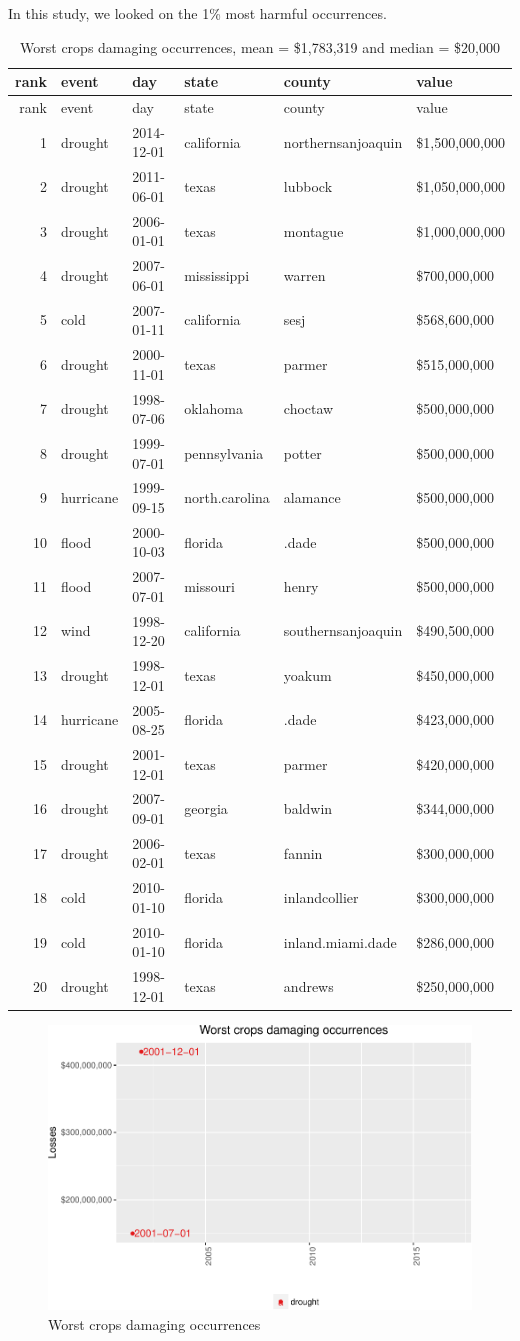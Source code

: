 \documentclass[]{article}
\begin{document}
In this study, we looked on the 1\% most harmful occurrences.

\begin{longtable}[]{@{}rlllll@{}}
\caption{Worst crops damaging occurrences, mean = \$1,783,319 and median
= \$20,000}\tabularnewline
\toprule
rank & event & day & state & county & value\tabularnewline
\midrule
\endfirsthead
\toprule
rank & event & day & state & county & value\tabularnewline
\midrule
\endhead
1 & drought & 2014-12-01 & california & northernsanjoaquin &
\$1,500,000,000\tabularnewline
2 & drought & 2011-06-01 & texas & lubbock &
\$1,050,000,000\tabularnewline
3 & drought & 2006-01-01 & texas & montague &
\$1,000,000,000\tabularnewline
4 & drought & 2007-06-01 & mississippi & warren &
\$700,000,000\tabularnewline
5 & cold & 2007-01-11 & california & sesj & \$568,600,000\tabularnewline
6 & drought & 2000-11-01 & texas & parmer & \$515,000,000\tabularnewline
7 & drought & 1998-07-06 & oklahoma & choctaw &
\$500,000,000\tabularnewline
8 & drought & 1999-07-01 & pennsylvania & potter &
\$500,000,000\tabularnewline
9 & hurricane & 1999-09-15 & north.carolina & alamance &
\$500,000,000\tabularnewline
10 & flood & 2000-10-03 & florida & .dade & \$500,000,000\tabularnewline
11 & flood & 2007-07-01 & missouri & henry &
\$500,000,000\tabularnewline
12 & wind & 1998-12-20 & california & southernsanjoaquin &
\$490,500,000\tabularnewline
13 & drought & 1998-12-01 & texas & yoakum &
\$450,000,000\tabularnewline
14 & hurricane & 2005-08-25 & florida & .dade &
\$423,000,000\tabularnewline
15 & drought & 2001-12-01 & texas & parmer &
\$420,000,000\tabularnewline
16 & drought & 2007-09-01 & georgia & baldwin &
\$344,000,000\tabularnewline
17 & drought & 2006-02-01 & texas & fannin &
\$300,000,000\tabularnewline
18 & cold & 2010-01-10 & florida & inlandcollier &
\$300,000,000\tabularnewline
19 & cold & 2010-01-10 & florida & inland.miami.dade &
\$286,000,000\tabularnewline
20 & drought & 1998-12-01 & texas & andrews &
\$250,000,000\tabularnewline
\bottomrule
\end{longtable}

\begin{figure}[htbp]
\centering
\includegraphics{readme_files/figure-latex/crop-single-plot-1.pdf}
\caption{Worst crops damaging occurrences}
\end{figure}
\end{document}
